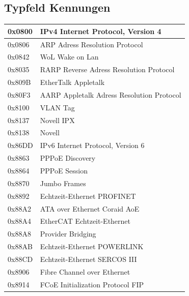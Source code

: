 \documentclass[12pt,a4paper]{article}
\begin{document}
\subsection{Typfeld Kennungen}
    \begin{table}[h]
        \centering
        \renewcommand{\arraystretch}{2}
        \begin{tabularx}{17cm}{|l|X|}
            \hline
            0x0800&IPv4 Internet Protocol, Version 4\\
            \hline
            0x0806&ARP Adress Resolution Protocol\\
            \hline
            0x0842&WoL Wake on Lan\\
            \hline
            0x8035&RARP Reverse Adress Resolution Protocol\\
            \hline
            0x809B&EtherTalk Appletalk\\
            \hline
            0x80F3&AARP Appletalk Adress Resolution Protocol\\
            \hline
            0x8100&VLAN Tag\\
            \hline
            0x8137&Novell IPX\\
            \hline
            0x8138&Novell\\
            \hline
            0x86DD&IPv6 Internet Protocol, Version 6\\
            \hline
            0x8863&PPPoE Discovery\\
            \hline
            0x8864&PPPoE Session\\
            \hline
            0x8870&Jumbo Frames\\
            \hline
            0x8892&Echtzeit-Ethernet PROFINET\\
            \hline
            0x88A2&ATA over Ethernet Coraid AoE\\
            \hline
            0x88A4&EtherCAT Echtzeit-Ethernet\\
            \hline
            0x88A8&Provider Bridging\\
            \hline
            0x88AB&Echtzeit-Ethernet POWERLINK\\
            \hline
            0x88CD&Echtzeit-Ethernet SERCOS III\\
            \hline
            0x8906&Fibre Channel over Ethernet\\
            \hline
            0x8914&FCoE Initialization Protocol FIP\\
            \hline
        \end{tabularx}
    \end{table}
\end{document}
